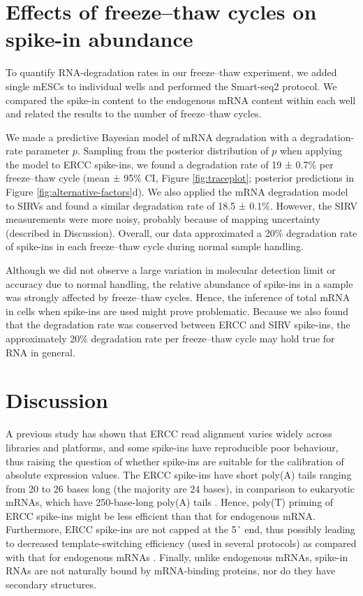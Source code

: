 \section{Effects of freeze–thaw cycles on spike-in abundance}

To quantify RNA-degradation rates in our freeze–thaw experiment, we added single mESCs to individual wells and performed the Smart-seq2 protocol. We compared the spike-in content to the endogenous mRNA content within each well and related the results to the number of freeze–thaw cycles.

We made a predictive Bayesian model of mRNA degradation with a degradation-rate parameter \( p \). Sampling from the posterior distribution of \( p \) when applying the model to ERCC spike-ins, we found a degradation rate of 19 ± 0.7\% per freeze–thaw cycle (mean ± 95\% CI, Figure \ref{fig:traceplot}; posterior predictions in Figure \ref{fig:alternative-factors}d). We also applied the mRNA degradation model to SIRVs and found a similar degradation rate of 18.5 ± 0.1\%. However, the SIRV measurements were more noisy, probably because of mapping uncertainty (described in Discussion). Overall, our data approximated a 20\% degradation rate of spike-ins in each freeze–thaw cycle during normal sample handling.

Although we did not observe a large variation in molecular detection limit or accuracy due to normal handling, the relative abundance of spike-ins in a sample was strongly affected by freeze–thaw cycles. Hence, the inference of total mRNA in cells when spike-ins are used might prove problematic. Because we also found that the degradation rate was conserved between ERCC and SIRV spike-ins, the approximately 20\% degradation rate per freeze–thaw cycle may hold true for RNA in general.

\section{Discussion}

A previous study has shown \cite{SEQCMAQC-III_Consortium2014-uk} that ERCC read alignment varies widely across libraries and platforms, and some spike-ins have reproducible poor behaviour, thus raising the question of whether spike-ins are suitable for the calibration of absolute expression values. The ERCC spike-ins have short poly(A) tails ranging from 20 to 26 bases long (the majority are 24 bases), in comparison to eukaryotic mRNAs, which have 250-base-long poly(A) tails \cite{Viphakone2008-kh}. Hence, poly(T) priming of ERCC spike-ins might be less efficient than that for endogenous mRNA. Furthermore, ERCC spike-ins are not capped at the 5´ end, thus possibly leading to decreased template-switching efficiency (used in several protocols) as compared with that for endogenous mRNAs \cite{Kapteyn2010-rm}. Finally, unlike endogenous mRNAs, spike-in RNAs are not naturally bound by mRNA-binding proteins, nor do they have secondary structures.

